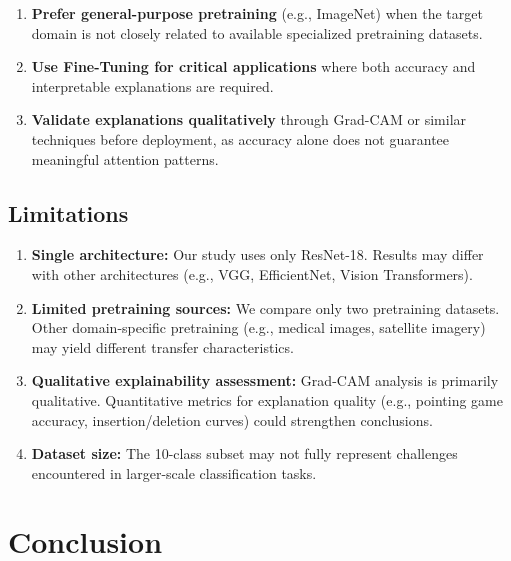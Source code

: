 \documentclass[11pt,a4paper]{article}
\begin{document}
\begin{enumerate}
    \item \textbf{Prefer general-purpose pretraining} (e.g., ImageNet) when the target domain is not closely related to available specialized pretraining datasets.

    \item \textbf{Use Fine-Tuning for critical applications} where both accuracy and interpretable explanations are required.

    \item \textbf{Validate explanations qualitatively} through Grad-CAM or similar techniques before deployment, as accuracy alone does not guarantee meaningful attention patterns.
\end{enumerate}

\subsection{Limitations}

\begin{enumerate}
    \item \textbf{Single architecture:} Our study uses only ResNet-18. Results may differ with other architectures (e.g., VGG, EfficientNet, Vision Transformers).

    \item \textbf{Limited pretraining sources:} We compare only two pretraining datasets. Other domain-specific pretraining (e.g., medical images, satellite imagery) may yield different transfer characteristics.

    \item \textbf{Qualitative explainability assessment:} Grad-CAM analysis is primarily qualitative. Quantitative metrics for explanation quality (e.g., pointing game accuracy, insertion/deletion curves) could strengthen conclusions.

    \item \textbf{Dataset size:} The 10-class subset may not fully represent challenges encountered in larger-scale classification tasks.
\end{enumerate}

\section{Conclusion}
\end{document}
